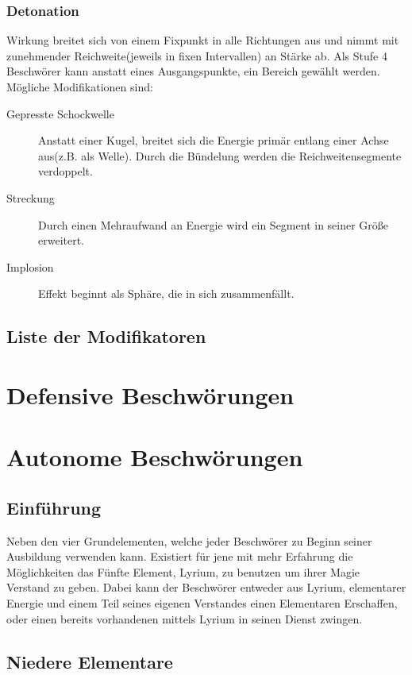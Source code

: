\documentclass[a4paper,12pt,oneside]{book}
\begin{document}
\section{Detonation}
Wirkung breitet sich von einem Fixpunkt in alle Richtungen aus und nimmt mit zunehmender Reichweite(jeweils in fixen Intervallen) an Stärke ab. Als Stufe 4 Beschwörer kann anstatt eines Ausgangspunkte, ein Bereich gewählt werden. Mögliche Modifikationen sind:
\begin{description}
\item[Gepresste Schockwelle]Anstatt einer Kugel, breitet sich die Energie primär entlang einer Achse aus(z.B. als Welle). Durch die Bündelung werden die Reichweitensegmente verdoppelt. 
\item[Streckung]Durch einen Mehraufwand an Energie wird ein Segment in seiner Größe erweitert.
\item[Implosion]Effekt beginnt als Sphäre, die in sich zusammenfällt.
\end{description}

\chapter{Liste der Modifikatoren}

\part{Defensive Beschwörungen}

\part{Autonome Beschwörungen}

\chapter{Einführung}
Neben den vier Grundelementen, welche jeder Beschwörer zu Beginn seiner Ausbildung verwenden kann. Existiert für jene mit mehr Erfahrung die Möglichkeiten das Fünfte Element, Lyrium, zu benutzen um ihrer Magie Verstand zu geben. Dabei kann der Beschwörer entweder aus Lyrium, elementarer Energie und einem Teil seines eigenen Verstandes einen Elementaren Erschaffen, oder einen bereits vorhandenen mittels Lyrium in seinen Dienst zwingen.

\chapter{Niedere Elementare}
\end{document}
